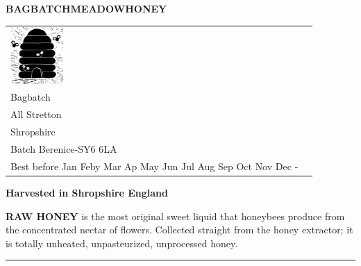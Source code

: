 \documentclass[10pt, a4paper]{letter}
\newcommand{\MONTH}{%
  \ifcase\the\month
  \or Jan%
  \or Feby%
  \or Mar%
  \or Ap%
  \or May%
  \or Jun%
  \or Jul%
  \or Aug%
  \or Sep%
  \or Oct%
  \or Nov%
  \or Dec%
  \fi}
\begin{document}

\newcommand\honeylabel{%
{\fontsize{15.5pt}{20pt}\selectfont  \textbf{BAGBATCH\hfil MEADOW\hfil HONEY}} 
  \begin{tabular}{ll}%
    \begin{minipage}{2cm}%
      \includegraphics[width=2cm]{meadow-honey-skep-lino-cut.jpg}
    \end{minipage}%
    &
    \begin{minipage}{4.5cm}
     \par
      454g 1lb \hfill \ECFAugie Joe Collins\\
      \footnotesize\strut\hfill Bagbatch\\
      \strut\hfill All Stretton\\
      \strut\hfill  Shropshire\\
      Batch Berenice-\the\month \hfill SY6 6LA\\
      \AdvanceDate[730]%
      Best before \MONTH-\the\year{} \hfill\strut 
    \end{minipage}
  \end{tabular}
{\fontsize{14pt}{20pt}\selectfont  \textbf{Harvested in Shropshire England}}
}%

\begin{labels}
%
{%
  \honeylabel
  
}%
\end{labels}

\LeftLabelBorder=5mm%
\RightLabelBorder=5mm%
\TopLabelBorder=5mm%
\BottomLabelBorder=5mm%
\LabelSetup%
\newcommand\rawlabel{%
  \small
  {\bf RAW HONEY} is the most original sweet liquid that honeybees produce from the concentrated nectar of flowers. 
   Collected straight from the honey extractor; it is totally unheated, unpasteurized, unprocessed honey.\vfill
}%

\begin{labels}
%
{%
  \rawlabel
  
}%
\end{labels}


\LeftPageMargin=0mm
\LabelSetup
\setlength{\parskip}{1em}
%
{%
  \rule{\paperwidth}{3pt}\par\par
}%
\end{document}
